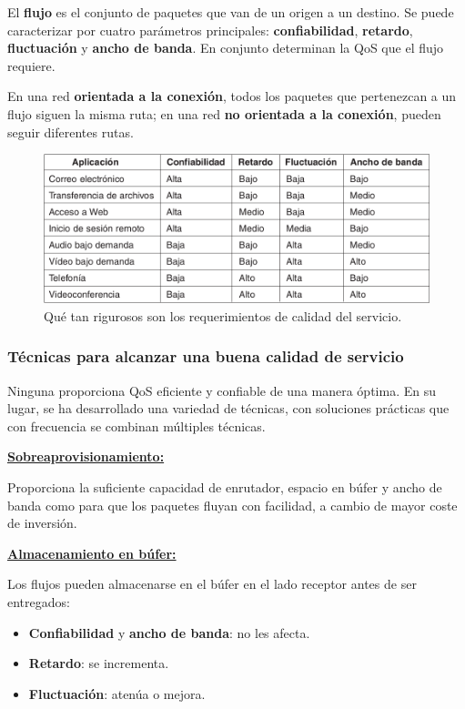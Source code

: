 \documentclass[10pt,a4paper]{article}
\begin{document}
El \textbf{flujo} es el conjunto de paquetes que van de un origen a un destino. Se puede caracterizar por cuatro parámetros principales: \textbf{confiabilidad}, \textbf{retardo}, \textbf{fluctuación} y \textbf{ancho de banda}. En conjunto determinan la QoS que el flujo requiere.

En una red \textbf{orientada a la conexión}, todos los paquetes que pertenezcan a un flujo siguen la misma ruta; en una red \textbf{no orientada a la conexión}, pueden seguir diferentes rutas. 

\begin{figure}[ht!]
  \caption{Qué tan rigurosos son los requerimientos de calidad del servicio.}  
  \label{fig:calidad_flujo}
  \centerline{\includegraphics[width=0.8\textwidth-\fboxrule-\fboxrule]{imgs/calidad_flujo.png}}
\end{figure}

\subsubsection{Técnicas para alcanzar una buena calidad de servicio}

Ninguna proporciona QoS eficiente y confiable de una manera óptima. En su lugar, se ha desarrollado una variedad de técnicas, con soluciones prácticas que con frecuencia se combinan múltiples técnicas.

\underline{\textbf{Sobreaprovisionamiento:}}

Proporciona la suficiente capacidad de enrutador, espacio en búfer y ancho de banda como para que los paquetes fluyan con facilidad, a cambio de mayor coste de inversión.

\underline{\textbf{Almacenamiento en búfer:}}

Los flujos pueden almacenarse en el búfer en el lado receptor antes de ser entregados:
\begin{itemize}
\item \textbf{Confiabilidad} y \textbf{ancho de banda}: no les afecta.
\item \textbf{Retardo}: se incrementa.
\item \textbf{Fluctuación}: atenúa o mejora.
\end{itemize}
\end{document}
